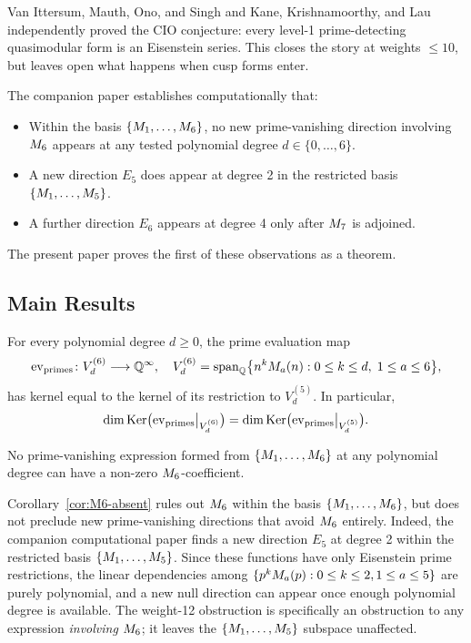 \documentclass[11pt]{article}
\begin{document}
Van Ittersum, Mauth, Ono, and Singh \cite{VIMOS2025} and Kane, Krishnamoorthy, and Lau
\cite{KKL2025} independently proved the CIO conjecture: every level-1 prime-detecting
quasimodular form is an Eisenstein series.
This closes the story at weights $\le 10$, but leaves open what happens when cusp forms
enter.

The companion paper \cite{Randsley2025b} establishes computationally that:
\begin{itemize}[leftmargin=*]
  \item Within the basis $\{M_{1},\dots,M_{6}\}$, no new prime-vanishing direction involving
        $M_{6}$ appears at any tested polynomial degree $d\in\{0,\dots,6\}$.
  \item A new direction $E_5$ does appear at degree 2 in the restricted basis
        $\{M_{1},\dots,M_{5}\}$.
  \item A further direction $E_6$ appears at degree 4 only after $M_{7}$ is adjoined.
\end{itemize}
The present paper proves the first of these observations as a theorem.

\subsection{Main Results}

\begin{theorem}
\label{thm:obstruction}
For every polynomial degree $d\ge 0$, the prime evaluation map
\[
  \mathrm{ev}_{\mathrm{primes}} \colon
  V_d^{(6)} \longrightarrow \mathbb{Q}^{\infty},
  \quad
  V_d^{(6)} = \operatorname{span}_{\mathbb{Q}}\bigl\{n^k M_{a}(n) : 0\le k\le d,\; 1\le a\le 6\bigr\},
\]
has kernel equal to the kernel of its restriction to $V_d^{(5)}$.
In particular,
\[
  \dim\operatorname{Ker}\bigl(\mathrm{ev}_{\mathrm{primes}}\big|_{V_d^{(6)}}\bigr)
  = \dim\operatorname{Ker}\bigl(\mathrm{ev}_{\mathrm{primes}}\big|_{V_d^{(5)}}\bigr).
\]
\end{theorem}

\begin{corollary}
\label{cor:M6-absent}
No prime-vanishing expression formed from $\{M_{1},\dots,M_{6}\}$ at any polynomial
degree can have a non-zero $M_{6}$-coefficient.
\end{corollary}

\begin{remark}
Corollary~\ref{cor:M6-absent} rules out $M_{6}$ within the basis $\{M_{1},\dots,M_{6}\}$,
but does not preclude new prime-vanishing directions that avoid $M_{6}$ entirely.
Indeed, the companion computational paper \cite{Randsley2025b} finds a new direction $E_5$
at degree 2 within the restricted basis $\{M_{1},\dots,M_{5}\}$.
Since these functions have only Eisenstein prime restrictions, the linear dependencies
among $\{p^kM_{a}(p) : 0\le k\le 2, 1\le a\le 5\}$ are purely polynomial, and a new
null direction can appear once enough polynomial degree is available.
The weight-12 obstruction is specifically an obstruction to any expression \emph{involving}
$M_{6}$; it leaves the $\{M_{1},\dots,M_{5}\}$ subspace unaffected.
\end{remark}
\end{document}
